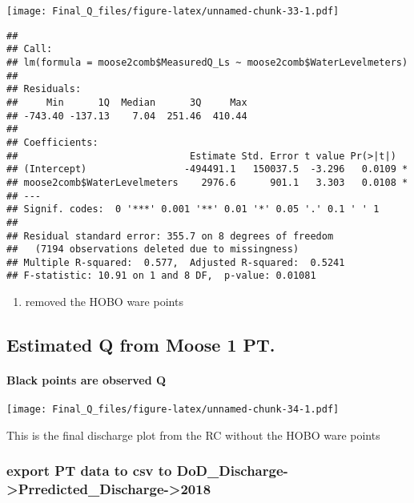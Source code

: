 \documentclass[
]{article}
\providecommand{\tightlist}{%
  \setlength{\itemsep}{0pt}\setlength{\parskip}{0pt}}
\begin{document}
\texttt{[image: Final\_Q\_files/figure-latex/unnamed-chunk-33-1.pdf]}

\begin{verbatim}
## 
## Call:
## lm(formula = moose2comb$MeasuredQ_Ls ~ moose2comb$WaterLevelmeters)
## 
## Residuals:
##     Min      1Q  Median      3Q     Max 
## -743.40 -137.13    7.04  251.46  410.44 
## 
## Coefficients:
##                              Estimate Std. Error t value Pr(>|t|)  
## (Intercept)                 -494491.1   150037.5  -3.296   0.0109 *
## moose2comb$WaterLevelmeters    2976.6      901.1   3.303   0.0108 *
## ---
## Signif. codes:  0 '***' 0.001 '**' 0.01 '*' 0.05 '.' 0.1 ' ' 1
## 
## Residual standard error: 355.7 on 8 degrees of freedom
##   (7194 observations deleted due to missingness)
## Multiple R-squared:  0.577,  Adjusted R-squared:  0.5241 
## F-statistic: 10.91 on 1 and 8 DF,  p-value: 0.01081
\end{verbatim}

\begin{enumerate}
\def\labelenumi{\arabic{enumi})}
\tightlist
\item
  removed the HOBO ware points
\end{enumerate}

\hypertarget{estimated-q-from-moose-1-pt.}{%
\subsection{Estimated Q from Moose 1
PT.}\label{estimated-q-from-moose-1-pt.}}

\hypertarget{black-points-are-observed-q-2}{%
\paragraph{Black points are observed
Q}\label{black-points-are-observed-q-2}}

\texttt{[image: Final\_Q\_files/figure-latex/unnamed-chunk-34-1.pdf]}

This is the final discharge plot from the RC without the HOBO ware
points

\hypertarget{export-pt-data-to-csv-to-dod_discharge-prredicted_discharge-2018}{%
\subsubsection{export PT data to csv to
DoD\_Discharge-\textgreater Prredicted\_Discharge-\textgreater2018}\label{export-pt-data-to-csv-to-dod_discharge-prredicted_discharge-2018}}
\end{document}
